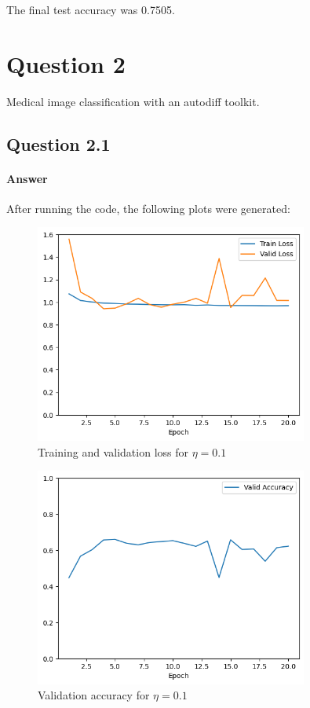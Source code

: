 \documentclass{article}
\begin{document}
The final test accuracy was 0.7505.

\section{Question 2}
Medical image classification with an autodiff toolkit.

\subsection{Question 2.1}

\paragraph{Answer} After running the code, the following plots were generated:

\begin{figure}[H]
    \centering
    \includegraphics[width=0.8\textwidth]{"plots/logistic_regression-training-loss-batch-16-lr-0.1-epochs-20-l2-0-opt-sgd.png"}
    \caption{Training and validation loss for $\eta = 0.1$}
    \label{2.1 0.1 Loss Plot}
\end{figure}

\begin{figure}[H]
    \centering
    \includegraphics[width=0.8\textwidth]{"plots/logistic_regression-validation-accuracy-batch-16-lr-0.1-epochs-20-l2-0-opt-sgd.png"}
    \caption{Validation accuracy for $\eta = 0.1$}
    \label{2.1 0.1 Acc Plot}
\end{figure}
\end{document}
